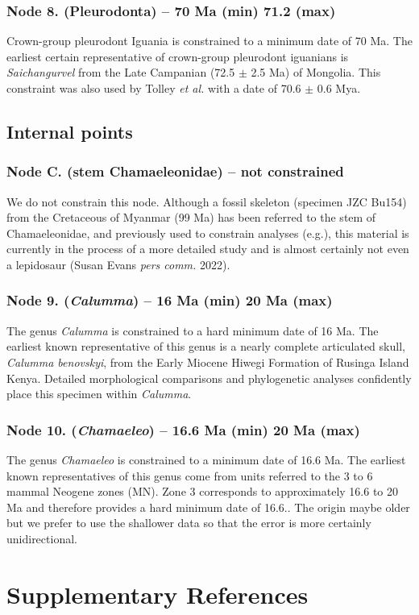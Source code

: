 \documentclass[a4paper, 12pt]{article}
\begin{document}
\subsubsection*{Node 8. (Pleurodonta) – 70 Ma (min) 71.2 (max)}
Crown-group pleurodont Iguania is constrained to a minimum date of 70 Ma. The earliest certain representative of crown-group pleurodont iguanians is \textit{Saichangurvel}\cite{conrad2007complete} from the Late Campanian (72.5 $\pm$ 2.5 Ma) of Mongolia. This constraint was also used by Tolley \textit{et al.}\cite{tolley2013large} with a date of 70.6 $\pm$ 0.6 Mya.
 
\subsection{Internal points}
\subsubsection*{Node C. (stem Chamaeleonidae) – not constrained}
We do not constrain this node. Although a fossil skeleton (specimen JZC Bu154) from the Cretaceous of Myanmar (99 Ma) has been referred to the stem of Chamaeleonidae\cite{daza2016mid}, and previously used to constrain analyses (e.g.\cite{skawinski2017evolution}), this material is currently in the process of a more detailed study and is almost certainly not even a lepidosaur (Susan Evans \textit{pers comm.} 2022).
 
\subsubsection*{Node 9. (\textit{Calumma}) – 16 Ma (min) 20 Ma (max)}
The genus \textit{Calumma} is constrained to a hard minimum date of 16 Ma. The earliest known representative of this genus is a nearly complete articulated skull, \textit{Calumma benovskyi}, from the Early Miocene Hiwegi Formation of Rusinga Island Kenya\cite{vcervnansky2020only}. Detailed morphological comparisons and phylogenetic analyses confidently place this specimen within \textit{Calumma}\cite{vcervnansky2020only}.
 
\subsubsection*{Node 10. (\textit{Chamaeleo}) – 16.6 Ma (min) 20 Ma (max)}
The genus \textit{Chamaeleo} is constrained to a minimum date of 16.6 Ma. The earliest known representatives of this genus come from units referred to the 3 to 6 mammal Neogene zones (MN)\cite{vcervnansky2010revision,bolet2013fossil}. Zone 3 corresponds to approximately 16.6 to 20 Ma and therefore provides a hard minimum date of 16.6.\cite{van2011biostratigraphy}. The origin maybe older but we prefer to use the shallower data so that the error is more certainly unidirectional.

\newpage
\section{Supplementary References}
 


\end{document}
